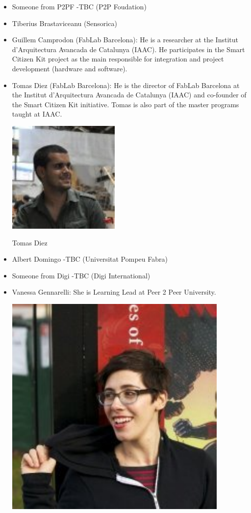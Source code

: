 \documentclass{tufte-book} %
\begin{document}
\begin{itemize}
\begin{itemize}
\item Someone from P2PF -TBC (P2P Foudation)
\item Tiberius Brastaviceanu (Sensorica)
\item Guillem Camprodon (FabLab Barcelona): He is a researcher at the Institut d'Arquitectura Avancada de Catalunya (IAAC). He participates in the Smart Citizen Kit project as the main responsible for integration and project development (hardware and software).
\item Tomas Diez (FabLab Barcelona): He is the director of FabLab Barcelona at the Institut d'Arquitectura Avancada de Catalunya (IAAC) and co-founder of the Smart Citizen Kit initiative. Tomas is also part of the master programs taught at IAAC.
\begin{marginfigure}
\includegraphics[width=0.5\linewidth]{tomas}
\caption{Tomas Diez}
\end{marginfigure}
\item Albert Domingo -TBC (Universitat Pompeu Fabra)
\item Someone from Digi -TBC (Digi International)
\item Vanessa Gennarelli: She is Learning Lead at Peer 2 Peer University.
\begin{marginfigure}
\includegraphics[width=0.5\linewidth]{vanessa}

\end{marginfigure}
\end{itemize}
\end{itemize}
\end{document}
